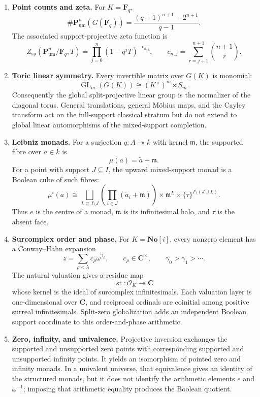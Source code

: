 \documentclass[11pt]{amsart}
\numberwithin{equation}{section}
\theoremstyle{definition}
\newcommand{\C}{\mathbf C}
\newcommand{\F}{\mathbf F}
\newcommand{\No}{\mathbf{No}}
\newcommand{\GL}{\operatorname{GL}}
\newcommand{\st}{\operatorname{st}}
\newcommand{\cO}{\mathcal O}
\newcommand{\Pum}{\mathbf P_{\mathrm{um}}}
\begin{document}
\begin{enumerate}[label=\textup{(\arabic*)},leftmargin=3.2em]
\item \textbf{Point counts and zeta.}
For $K=\F_q$,
\[
\#\Pum^n(G(\F_q))
=
\frac{(q+1)^{n+1}-2^{n+1}}{q-1}.
\]
The associated support-projective zeta function is
\[
Z_{\mathrm{sp}}(\Pum^n/\F_q,T)
=
\prod_{j=0}^{n}(1-q^jT)^{-c_{n,j}},
\qquad
c_{n,j}=\sum_{r=j+1}^{n+1}\binom{n+1}{r}.
\]

\item \textbf{Toric linear symmetry.}
Every invertible matrix over $G(K)$ is monomial:
\[
\GL_m(G(K))\cong(K^\times)^m\rtimes S_m.
\]
Consequently the global split-projective linear group is the normalizer of the diagonal torus.  General translations, general M\"obius maps, and the Cayley transform act on the full-support classical stratum but do not extend to global linear automorphisms of the mixed-support completion.

\item \textbf{Leibniz monads.}
For a surjection $q:A\twoheadrightarrow k$ with kernel $\mathfrak m$, the supported fibre over $a\in k$ is
\[
\mu(a)=\widetilde a+\mathfrak m.
\]
For a point with support $J\subseteq I$, the upward mixed-support monad is a Boolean cube of such fibres:
\[
\mu^\square(a)
\cong
\bigsqcup_{L\subseteq I\setminus J}
\left(\prod_{i\in J}(\widetilde a_i+\mathfrak m)\right)
\times \mathfrak m^L\times\{\tau\}^{I\setminus(J\cup L)}.
\]
Thus $e$ is the centre of a monad, $\mathfrak m$ is its infinitesimal halo, and $\tau$ is the absent face.

\item \textbf{Surcomplex order and phase.}
For $K=\No[i]$, every nonzero element has a Conway--Hahn expansion
\[
z=\sum_{\rho<\lambda}c_\rho\omega^{\gamma_\rho},
\qquad c_\rho\in\C^\times,
\qquad \gamma_0>\gamma_1>\cdots.
\]
The natural valuation gives a residue map
\[
\st:\cO_K\twoheadrightarrow\C
\]
whose kernel is the ideal of surcomplex infinitesimals.  Each valuation layer is one-dimensional over $\C$, and reciprocal ordinals are coinitial among positive surreal infinitesimals.  Split-zero globalization adds an independent Boolean support coordinate to this order-and-phase arithmetic.

\item \textbf{Zero, infinity, and univalence.}
Projective inversion exchanges the supported and unsupported zero points with corresponding supported and unsupported infinity points.  It yields an isomorphism of pointed zero and infinity monads.  In a univalent universe, that equivalence gives an identity of the structured monads, but it does not identify the arithmetic elements $e$ and $\omega^{-1}$; imposing that arithmetic equality produces the Boolean quotient.
\end{enumerate}
\end{document}
